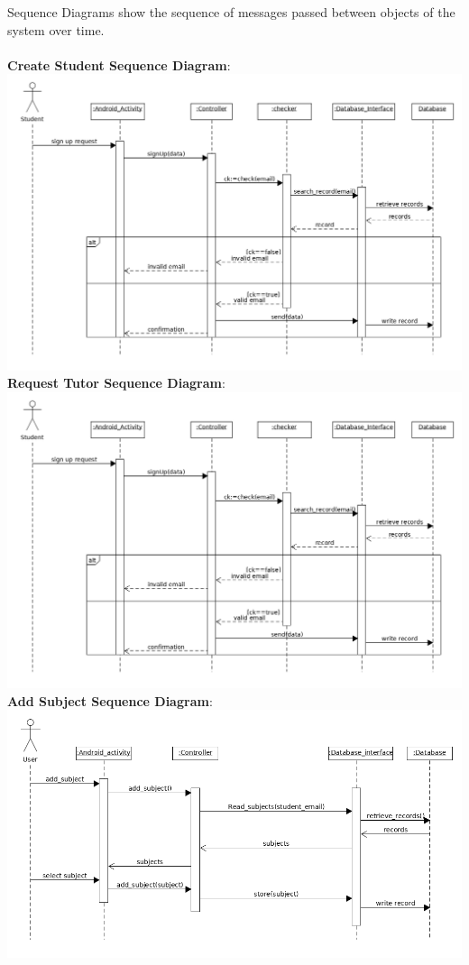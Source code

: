\documentclass[12pt]{article}
\begin{document}
Sequence Diagrams show the sequence of messages passed between objects of the system over time.\\
\\\textbf{Create Student Sequence Diagram}:\\
\includegraphics[width=140mm]{./sequence_diagram/create_student.png}
\textbf{Request Tutor Sequence Diagram}:\\
\includegraphics[width=140mm]{./sequence_diagram/request_tutor.png}
\textbf{Add Subject Sequence Diagram}:\\
\includegraphics[width=140mm]{./sequence_diagram/add_subject.png}
\end{document}
